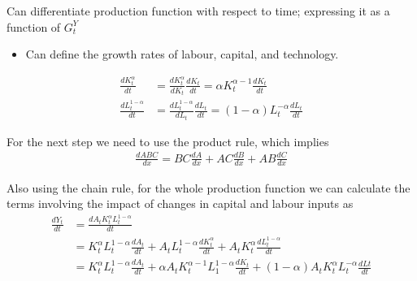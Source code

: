 \documentclass{beamer}
\begin{document}
\begin{frame}
  Can differentiate production function with respect to time; expressing it as a function of $G^Y_t$ 
  \begin{itemize}
    \item Can define the growth rates of labour, capital, and technology. 
  \end{itemize}
  \begin{align}
    \frac{dK_t^{\alpha}}{dt} &= \frac{dK_t^{\alpha}}{dK_t}\frac{dK_t}{dt} =\alpha K_t^{\alpha-1}\frac{dK_t}{dt}\\
    \frac{dL_t^{1-\alpha}}{dt} &= \frac{dL_t^{1-\alpha}}{dL_t}\frac{dL_t}{dt} = (1-\alpha)L_t^{-\alpha}\frac{dL_t}{dt}
  \end{align}
\end{frame}

\begin{frame}
 For the next step we need to use the product rule, which implies
\begin{align}
  \frac{dABC}{dx}=BC\frac{dA}{dx}+AC\frac{dB}{dx}+AB\frac{dC}{dx}
\end{align}
\end{frame}

\begin{frame}
 Also using the chain rule, for the whole production function we can calculate the terms involving the impact of changes in capital and labour inputs as
  \begin{align}
    \frac{dY_t}{dt} &= \frac{dA_tK_t^{\alpha}L_t^{1-\alpha}}{dt}\\
    &= K_t^{\alpha}L_t^{1-\alpha}\frac{dA_t}{dt} + A_tL_t^{1-\alpha}\frac{dK_t^{\alpha}}{dt} + A_tK_t^{\alpha}\frac{dL_t^{1-\alpha}}{dt}\\
    &= K_t^{\alpha}L_t^{1-\alpha}\frac{dA_t}{dt} + \alpha A_tK_t^{\alpha-1}L_1^{1-\alpha} \frac{dK_t}{dt}  + (1-\alpha)A_tK_t^{\alpha}L_t^{-\alpha}\frac{dLt}{dt}
  \end{align}
\end{frame}
\end{document}

